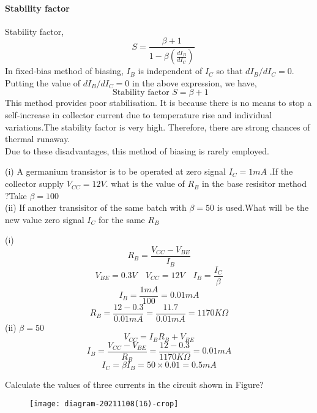    \paragraph{Stability factor}
   Stability factor, $$\quad S=\frac{\beta+1}{1-\beta\left(\frac{d I_{B}}{d I_{C}}\right)}$$
   In fixed-bias method of biasing, $I_{B}$ is independent of $I_{C}$ so that $d I_{B} / d I_{C}=0$.\\
    Putting the value of $d I_{B} / d I_{C}=0$ in the above expression, we have,
   $$\text{ Stability factor }S=\beta+1$$
   This method provides poor stabilisation. It is because there is no means to stop a self-increase in collector current due to temperature rise and individual variations.The stability factor is very high. Therefore, there are strong chances of thermal runaway.\\
   Due to these disadvantages, this method of biasing is rarely employed.
   \begin{exercise}
   {(i)}	A germanium transistor is to be operated at zero signal $I_C=1mA$ .If the collector supply $V_{CC}=12V$. what is the value of $R_B$ in the base resisitor method ?Take $\beta=100$\\
   {(ii)} If another transisitor of the same batch with $\beta=50$ is used.What will be the new value zero signal $I_C$ for the same $R_B$
   \end{exercise}
\begin{answer}(i)
	$$R_B=\frac{V_{CC}-V_{BE}}{I_B}$$
	$$V_{BE}=0.3V \quad V_{CC}=12V \quad I_B=\frac{I_C}{\beta}$$
	$$I_B=\frac{1mA}{100}=0.01mA$$
	$$R_B=\frac{12-0.3}{0.01mA}=\frac{11.7}{0.01mA}=1170K\Omega$$
	(ii)
	$\beta=50$\\
	$$V_{CC}=I_BR_B+V_{BE}$$
	$$I_B=\frac{V_{CC}-V_{BE}}{R_B}=\frac{12-0.3}{1170K\Omega}=0.01mA$$
	$$I_C=\beta I_B=50\times 0.01=0.5mA$$
\end{answer}
\begin{exercise}
	Calculate the values of three currents in the circuit shown in Figure?
	\begin{figure}[H]
		\centering
		\texttt{[image: diagram-20211108(16)-crop]}
		\caption{}
		\label{}
	\end{figure}
\end{exercise}
